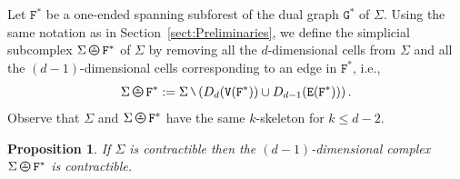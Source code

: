 \documentclass[11pt]{amsart}
\theoremstyle{definition}
\theoremstyle{plain}
\newtheorem{proposition}[definition]{Proposition}
\newcommand{\<}{\langle}
\renewcommand{\>}{\rangle}
\newcommand\GGG{\mathtt{G}}
\newcommand\VVV{\mathtt{V}}
\newcommand\EEE{\mathtt{E}}
\newcommand{\Dual}{D}
\newcommand{\oPerpStar}{\begin{tikzpicture}[scale=0.134]
\draw[thick,line width=0.7pt](-0.6,-0.2)--(0.6,-0.2) ;
    \draw (0,0.1) node[scale=0.6] {\rm{*}};
  \draw[line width=0.7pt] (0,0) circle [radius=1];
\end{tikzpicture}}
\newcommand{\oPerpstar}{\mathbin{\raisebox{-1pt}{\oPerpStar}}}
\newcommand{\mysetminusD}{\hbox{\tikz{\draw[line width=0.6pt,line cap=round] (3pt,0) -- (0,6pt);}}}
\newcommand{\mysetminusT}{\mysetminusD}
\newcommand{\mysetminusS}{\hbox{\tikz{\draw[line width=0.45pt,line cap=round] (2pt,0) -- (0,4pt);}}}
\newcommand{\mysetminusSS}{\hbox{\tikz{\draw[line width=0.4pt,line cap=round] (1.5pt,0) -- (0,3pt);}}}
\newcommand{\mysetminus}{\mathbin{\mathchoice{\mysetminusD}{\mysetminusT}{\mysetminusS}{\mysetminusSS}}}%
\begin{document}
Let ${\mathtt{F}^{*}}$ be a one-ended spanning subforest of the dual graph ${{\GGG}^*}$ of ${\Sigma}$. Using the same notation as in Section~\ref{sect:Preliminaries}, we define the simplicial subcomplex ${\Sigma} \oPerpstar {{\mathtt{F}^{*}}}$ of ${\Sigma}$
 by removing all the $d$-dimensional cells from ${\Sigma}$ and all the $(d-1)$-dimensional cells
 corresponding to an edge in ${\mathtt{F}^{*}}$, i.e., \[{\Sigma} \oPerpstar {\mathtt{F}^{*}}:={\Sigma}\mysetminus \left(\Dual_{d}(\VVV({\mathtt{F}^{*}}))\cup \Dual_{d-1}(\EEE({\mathtt{F}^{*}}))\right).\]
Observe that ${\Sigma}$ and ${\Sigma} \oPerpstar {\mathtt{F}^{*}}$ have the same $k$-skeleton for $k\leq d-2$.


\begin{proposition}\label{Sigma-F is contractible}
If ${\Sigma} $ is contractible then the $(d-1)$-dimensional complex ${\Sigma} \oPerpstar {\mathtt{F}^{*}}$ is contractible.
\end{proposition}
\end{document}
